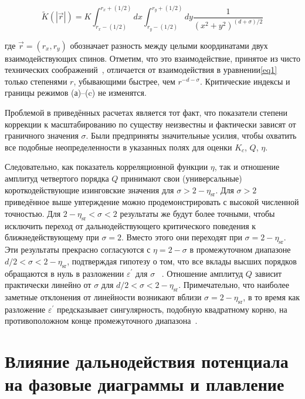 \begin{equation}
  \tilde{K}(|\vec{r}|)=K \int_{r_{x}-(1 / 2)}^{r_{x}+(1 / 2)} d x \int_{r_{y}-(1 / 2)}^{r_{y}+(1 / 2)} d y \frac{1}{\left(x^{2}+y^{2}\right)^{(d+\sigma) / 2}}
\end{equation}

где $\vec r=\left(r_{x}, r_{y}\right)$ обозначает разность между целыми координатами двух взаимодействующих спинов. 
Отметим, что это взаимодействие, принятое из чисто технических соображений~\cite{10.1142/S0129183195000265}, отличается от взаимодействия в уравнении\ref{eq1} только степенями $r$, убывающими быстрее, чем $r^{-d-\sigma}$.
Критические индексы и границы режимов (а)–(c) не изменятся.

Проблемой в приведённых расчетах является тот факт, что показатели степени коррекции к масштабированию по существу неизвестны и фактически зависят от граничного значения $\sigma$. 
Были предприняты значительные усилия, чтобы охватить все подобные неопределенности в указанных полях для оценки $K_{c}$, $Q$, $\eta$.

Следовательно, как показатель корреляционной функции $\eta$, так и отношение амплитуд четвертого порядка $Q$ принимают свои (универсальные) короткодействующие изинговские значения для $\sigma>2-\eta_{\mathrm{sr}}$. 
Для $\sigma>2$ приведённое выше увтерждение можно продемонстрировать с высокой численной точностью. Для $2-\eta_{\mathrm{sr}}<\sigma<2$ результаты же будут более точными, чтобы исключить переход от дальнодействующего критического поведения к ближнедействующему при $\sigma=2$.
Вместо этого они переходят при $\sigma=2-\eta_{\mathrm{sr}}$. 
Эти результаты прекрасно согласуются с $\eta=2-\sigma$ в промежуточном диапазоне $d/2<\sigma<2-\eta_{\mathrm{sr}}$, подтверждая гипотезу о том, что все вклады высших порядков обращаются в нуль в разложении $\varepsilon^{\prime}$ для $\sigma$ ~\cite{10.1103/PhysRevLett.29.917}.
Отношение амплитуд $Q$ зависит практически линейно от $\sigma$ для $d/2<\sigma<2-\eta_{\mathrm{sr}}$.
Примечательно, что наиболее заметные отклонения от линейности возникают вблизи $\sigma=2-\eta_{\mathrm{sr}}$, в то время как разложение $\varepsilon^{\prime}$ предсказывает сингулярность, подобную квадратному корню, на противоположном конце промежуточного диапазона~\cite{10.1103/PhysRevE.60.7558}.


\section{Влияние дальнодействия потенциала на фазовые диаграммы и плавление}


